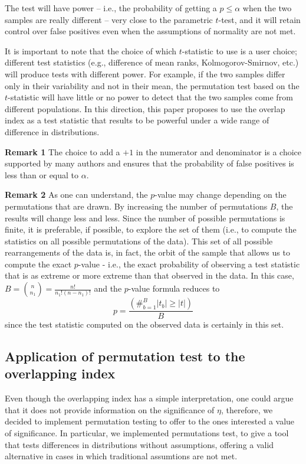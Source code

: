 \documentclass[twocolumn]{article}\usepackage[]{graphicx}\usepackage[]{xcolor}
\begin{document}
The test will have power -- i.e., the probability of getting a $p\leq \alpha$ when the two samples are really different -- very close to the parametric $t$-test, and it will retain control over false positives even when the assumptions of normality are not met.

It is important to note that the choice of which $t$-statistic to use is a user choice; different test statistics (e.g., difference of mean ranks, Kolmogorov-Smirnov, etc.) will produce tests with different power. For example, if the two samples differ only in their variability and not in their mean, the permutation test based on the $t$-statistic will have little or no power to detect that the two samples come from different populations.
In this direction, this paper proposes to use the overlap index as a test statistic that results to be powerful under a wide range of difference in distributions.

{\bf Remark 1} The choice to add a $+1$ in the numerator and denominator is a choice supported by many authors \cite{phipson2010permutation,hemerik2018exact} and ensures that the probability of false positives is less than or equal to $\alpha$.

{\bf Remark 2} As one can understand, the $p$-value may change depending on the permutations that are drawn. By increasing the number of permutations $B$, the results will change less and less. Since the number of possible permutations is finite, it is preferable, if possible, to explore the set of them (i.e., to compute the statistics on all possible permutations of the data). This set of all possible rearrangements of the data is, in fact, the orbit of the sample that allows us to compute the exact $p$-value - i.e., the exact probability of observing a test statistic that is as extreme or more extreme than that observed in the data. In this case, $B=\binom{n}{n_1} = \frac{n!}{n_1!(n-n_1)!}$ and the $p$-value formula reduces to $$p=\frac{(\#_{b=1}^B |t_b|\geq |t|)}{B}$$ since the test statistic computed on the observed data is certainly in this set.


\subsection{Application of permutation test to the overlapping index}

Even though the overlapping index has a simple interpretation, one could argue that it does not provide information on the significance of $\eta$, therefore, we decided to implement permutation testing to offer to the ones interested a value of significance. In particular, we implemented permutations test, to give a tool that tests differences in distributions without assumptions, offering a valid alternative in cases in which traditional assumtions are not met. 
\end{document}
